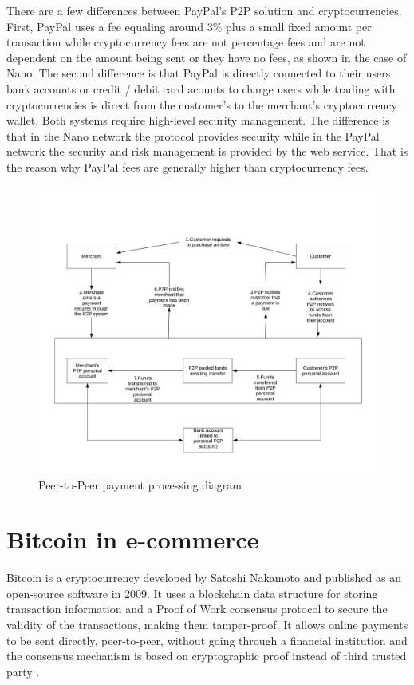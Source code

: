 \documentclass{ferseminar}
\begin{document}
There are a few differences between PayPal's P2P solution and cryptocurrencies. First, PayPal uses a fee equaling around 3\% plus a small fixed amount per transaction while cryptocurrency fees are not percentage fees and are not dependent on the amount being sent or they have no fees, as shown in the case of Nano. The second difference is that PayPal is directly connected to their users bank accounts or credit / debit card acounts to charge users while trading with cryptocurrencies is direct from the customer's to the merchant's cryptocurrency wallet. Both systems require high-level security management. The difference is that in the Nano network the protocol provides security while in the PayPal network the security and risk management is provided by the web service. That is the reason why PayPal fees are generally higher than cryptocurrency fees.

\begin{figure}[ht]
	\caption{Peer-to-Peer payment processing diagram}
	\includegraphics[scale=0.19]{diagram3}
	\centering
\end{figure}
\FloatBarrier

\section{Bitcoin in e-commerce}

Bitcoin is a cryptocurrency developed by Satoshi Nakamoto and published as an open-source software in 2009. It uses a blockchain data structure for storing transaction information and a Proof of Work consensus protocol to secure the validity of the transactions, making them tamper-proof. It allows online payments to be sent directly, peer-to-peer, without going through a financial institution and the consensus mechanism is based on cryptographic proof instead of third trusted party \cite{Bitcoin}.
\end{document}
